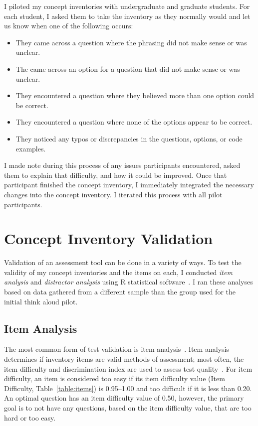 I piloted my concept inventories with undergraduate and graduate students. For each student, I asked them to take the inventory as they normally would and let us know when one of the following occurs:
	
	\begin{itemize}
		\item They came across a question where the phrasing did not make sense or was unclear.
		\item The came across an option for a question that did not make sense or was unclear.
		\item They encountered a question where they believed more than one option could be correct.
		\item They encountered a question where none of the options appear to be correct.
		\item They noticed any typos or discrepancies in the questions, options, or code examples.
	\end{itemize}
	
I made note during this process of any issues participants encountered, asked them to explain that difficulty, and how it could be improved. Once that participant finished the concept inventory, I immediately integrated the necessary changes into the concept inventory. I iterated this process with all pilot participants.

\section{Concept Inventory Validation}

Validation of an assessment tool can be done in a variety of ways.
To test the validity of my concept inventories and the items on each, I conducted \textit{item analysis} and \textit{distractor analysis} using R statistical software~\cite{boopathiraj2013analysis, RSoftware}. 
I ran these analyses based on data gathered from a different sample than the group used for the initial think aloud pilot. 

\subsection{Item Analysis}
The most common form of test validation is item analysis~\cite{gorsuch1997exploratory}.
Item analysis determines if inventory items are valid methods of assessment; most often, the item difficulty and discrimination index are used to assess test quality~\cite{boopathiraj2013analysis}. For item difficulty, an item is considered too easy if its item difficulty value (Item Difficulty, Table~\ref{table:items}) is 0.95--1.00 and too difficult if it is less than 0.20. An optimal question has an item difficulty value of 0.50, however, the primary goal is to not have any questions, based on the item difficulty value, that are too hard or too easy. 

